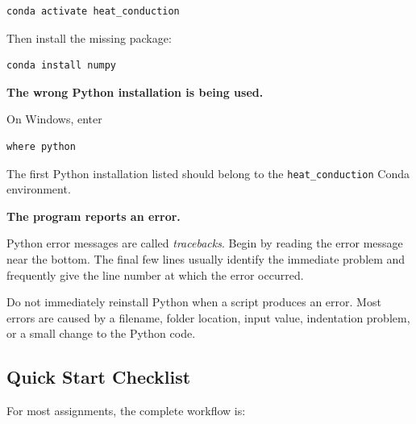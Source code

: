 \documentclass[11pt]{article}
\begin{document}
\begin{lstlisting}
conda activate heat_conduction
\end{lstlisting}

Then install the missing package:

\begin{lstlisting}
conda install numpy
\end{lstlisting}

\vspace{5pt}

\textbf{The wrong Python installation is being used.}

On Windows, enter

\begin{lstlisting}
where python
\end{lstlisting}

The first Python installation listed should belong to the
\texttt{heat\_conduction} Conda environment.

\vspace{5pt}

\textbf{The program reports an error.}

Python error messages are called \textit{tracebacks}. Begin by reading
the error message near the bottom. The final few lines usually identify
the immediate problem and frequently give the line number at which the
error occurred.

Do not immediately reinstall Python when a script produces an error.
Most errors are caused by a filename, folder location, input value,
indentation problem, or a small change to the Python code.

\subsection*{Quick Start Checklist}

For most assignments, the complete workflow is:
\end{document}
